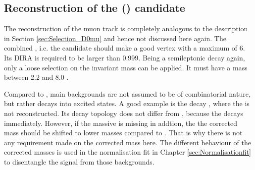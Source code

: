 \subsection{Reconstruction of the \Lb (\Lc\mun) candidate}
The reconstruction of the muon track is completely analogous to the description in Section \ref{sec:Selection_D0mu} and hence not discussed here again.
The combined \Lc\mun, i.e. the \Lb candidate should make a good vertex with a maximum \chisqvtx of 6.
Its DIRA is required to be larger than 0.999.
Being a semileptonic decay again, only a loose selection on the invariant \Lc\mun mass can be applied.
It must have a mass between 2.2 and 8.0 \gev.

Compared to \LbToDpmunuX, main backgrounds are not assumed to be of combinatorial nature, but rather \Lb decays into excited \Lc states.
A good example is the decay , where the \piz is not reconstructed.
Its decay topology does not differ from \LbToLcmunu, because the  decays immediately.
However, if the massive \piz is missing in addtion, the the corrected \Lb mass should be shifted to lower masses compared to \LbToLcmunu.
That is why there is not any requirement made on the \Lb corrected mass here.
The different behaviour of the corrected masses is used in the normalisation fit in Chapter \ref{sec:Normalisationfit}  to disentangle the signal from those backgrounds.

